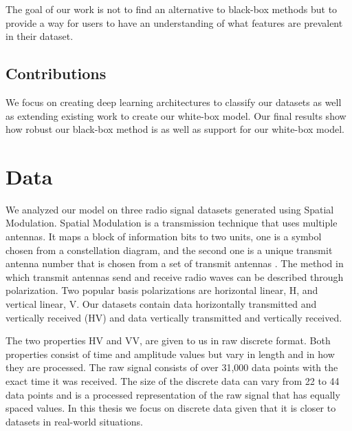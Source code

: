 \documentclass{turabian-thesis}
\begin{document}
The goal of our work is not to find an alternative to black-box methods but to provide a way for users to have an understanding of what features are prevalent in their dataset.


\section{Contributions}
We focus on creating deep learning architectures to classify our datasets as well as extending existing work to create our white-box model. Our final results show how robust our black-box method is as well as support for our white-box model.


\chapter{Data}

We analyzed our model on three radio signal datasets generated using Spatial Modulation. Spatial Modulation is a transmission technique that uses multiple antennas. It maps a block of information bits to two units, one is a symbol chosen from a constellation diagram, and the second one is a unique transmit antenna number that is chosen from a set of transmit antennas \cite{mesleh_spatial_2008}. The method in which transmit antennas send and receive radio waves can be described through polarization. Two popular basis polarizations are horizontal linear, H, and vertical linear, V. Our datasets contain data horizontally transmitted and vertically received (HV) and data vertically transmitted and vertically received.


The two properties HV and VV, are given to us in raw discrete format. Both properties consist of time and amplitude values but vary in length and in how they are processed. The raw signal consists of over 31,000 data points with the exact time it was received. The size of the discrete data can vary from 22 to 44 data points and is a processed representation of the raw signal that has equally spaced values. In this thesis we focus on discrete data given that it is closer to datasets in real-world situations.
\end{document}
